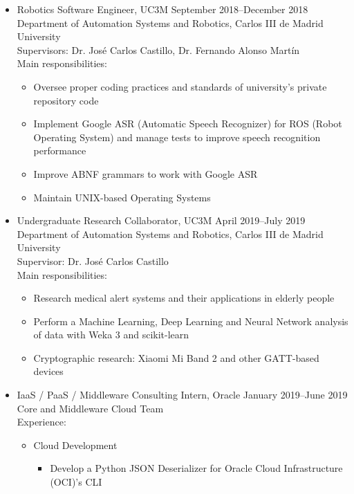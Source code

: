 \documentclass[11pt]{article}
\begin{document}
\begin{itemize}[leftmargin=12pt]
    \item[] Robotics Software Engineer, UC3M \hfill September 2018--December 2018 \\
    Department of Automation Systems and Robotics, Carlos III de Madrid University \\
    Supervisors: Dr. José Carlos Castillo, Dr. Fernando Alonso Martín \\
    Main responsibilities:
    \begin{itemize}
        \item Oversee proper coding practices and standards of university's private repository code
        \item Implement Google ASR (Automatic Speech Recognizer) for ROS (Robot Operating System) and manage tests to improve speech recognition performance
        \item Improve ABNF grammars to work with Google ASR
        \item Maintain UNIX-based Operating Systems
    \end{itemize}
    \item[] Undergraduate Research Collaborator, UC3M \hfill April 2019--July 2019 \\
    Department of Automation Systems and Robotics, Carlos III de Madrid University \\
    Supervisor: Dr. José Carlos Castillo \\
    Main responsibilities:
    \begin{itemize}
        \item Research medical alert systems and their applications in elderly people
        \item Perform a Machine Learning, Deep Learning and Neural Network analysis of data with Weka 3 and scikit-learn
        \item Cryptographic research: Xiaomi Mi Band 2 and other GATT-based devices
    \end{itemize}
  \item[] IaaS / PaaS / Middleware Consulting Intern, Oracle \hfill January 2019--June 2019 \\
  Core and Middleware Cloud Team \\
  Experience: 
  \begin{itemize}
        \item Cloud Development
        \begin{itemize}
            \item Develop a Python JSON Deserializer for Oracle Cloud Infrastructure (OCI)'s CLI 

\end{itemize}
\end{itemize}
\end{itemize}
\end{document}
